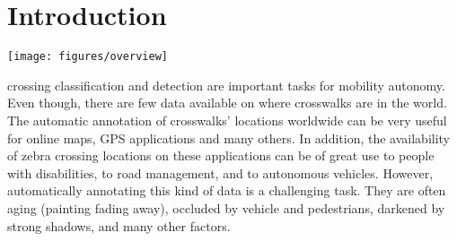 \documentclass[journal]{IEEEtran}
\newcommand{\GoogleStaticMapsAPI}{Google Static Maps API\xspace}
\newcommand{\GoogleDirectionsAPI}{Google Maps Directions API\xspace}
\begin{document}
\IEEEpeerreviewmaketitle


\section{Introduction}

\begin{figure*}
	\centering
	\texttt{[image: figures/overview]}
	\caption{System architecture. The input is a region (red dashed rectangle) or a set of regions of interest. Firstly, known crosswalk locations (red markers) are retrieved using the OpenStreetMap (OSM). Secondly, using \GoogleDirectionsAPI, paths (blue dashed arrows) between the crosswalk locations are defined. Thirdly, these paths are decoded and the result locations are filtered (only locations within the green area are accepted) in order to decrease the amount of wrongly annotated images. At this point, positive and negative samples can be downloaded from \GoogleStaticMapsAPI. Finally, this large-scale satellite imagery is used to train Convolutional Neural Networks (ConvNets) to perform zebra crossing classification.}
	\label{fig:proposed-model}
\end{figure*}

 crossing classification and detection are important tasks for mobility autonomy. Even though, there are few data available on where crosswalks are in the world. The automatic annotation of crosswalks' locations worldwide can be very useful for online maps, GPS applications and many others. In addition, the availability of zebra crossing locations on these applications can be of great use to people with disabilities, to road management, and to autonomous vehicles. However, automatically annotating this kind of data is a challenging task. They are often aging (painting fading away), occluded by vehicle and pedestrians, darkened by strong shadows, and many other factors.
\end{document}
